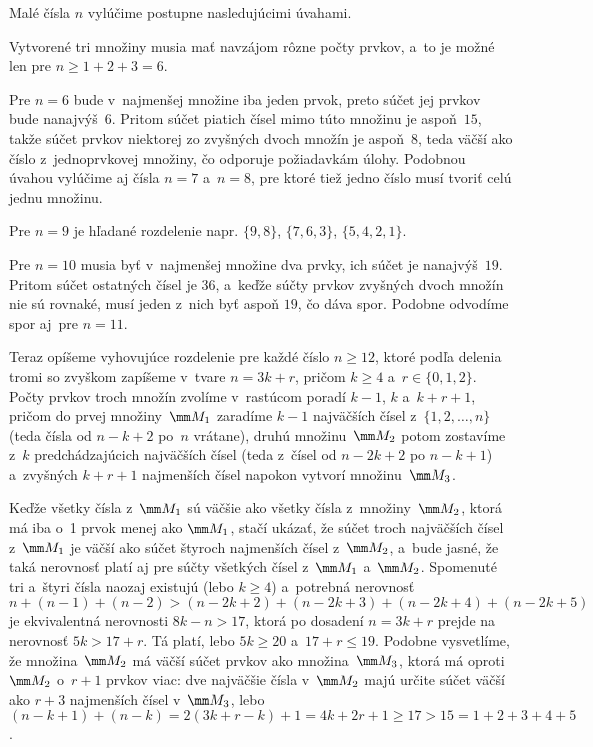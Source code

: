 {%
Malé čísla $n$ vylúčime postupne nasledujúcimi úvahami.

Vytvorené tri množiny musia mať navzájom rôzne počty prvkov, a~to
je možné len pre $n\ge1+2+3= 6$.

Pre $n = 6$ bude v~najmenšej množine iba jeden prvok, preto súčet
jej prvkov bude nanajvýš~$6$. Pritom súčet piatich čísel mimo túto
množinu je aspoň~$15$, takže súčet prvkov niektorej zo
zvyšných dvoch množín je aspoň~$8$, teda väčší ako číslo z~jednoprvkovej
množiny, čo odporuje požiadavkám úlohy. Podobnou
úvahou vylúčime aj čísla $n = 7$ a~$n = 8$, pre ktoré tiež
jedno číslo musí tvoriť celú jednu množinu.

Pre $n=9$ je hľadané rozdelenie napr. $\{9, 8\}$, $\{7, 6, 3\}$, $\{5, 4, 2, 1\}$.

Pre $n = 10$ musia byť v~najmenšej množine dva prvky, ich súčet je
nanajvýš~$19$. Pritom súčet ostatných čísel je $36$, a~keďže
súčty prvkov zvyšných dvoch množín nie sú rovnaké, musí jeden
z~nich byť aspoň $19$, čo dáva spor. Podobne odvodíme spor
aj~pre $n = 11$.

Teraz opíšeme vyhovujúce rozdelenie pre každé číslo $n\ge12$,
ktoré podľa delenia tromi so zvyškom zapíšeme v~tvare $n=3k+r$,
pričom $k\ge4$ a~$r\in\{0, 1, 2\}$. Počty prvkov troch množín zvolíme
v~rastúcom poradí $k-1$, $k$ a~$k+r+1$, pričom do prvej množiny~$\mm M_1$
zaradíme $k-1$ najväčších čísel z~$\{1, 2, \dots,n\}$ (teda čísla
od $n-k+2$ po~$n$ vrátane), druhú množinu~$\mm M_2$ potom zostavíme
z~$k$ predchádzajúcich najväčších čísel (teda z~čísel od $n-2k+2$ po
$n-k+1$) a~zvyšných $k+r+1$ najmenších čísel napokon vytvorí množinu~$\mm M_3$.

Keďže všetky čísla z~$\mm M_1$ sú väčšie ako všetky čísla
z~množiny~$\mm M_2$, ktorá má iba o~1 prvok menej ako $\mm M_1$, stačí
ukázať, že súčet troch najväčších čísel z~$\mm M_1$ je väčší ako
súčet štyroch najmenších čísel z~$\mm M_2$, a~bude jasné, že taká
nerovnosť platí aj pre súčty všetkých čísel z~$\mm M_1$ a~$\mm M_2$.
Spomenuté tri a~štyri čísla naozaj existujú (lebo $k\ge4$)
a~potrebná nerovnosť $n+(n-1)+(n-2)>(n-2k+2)+(n-2k+3)+(n-2k+4)+{(n-2k+5)}$
je ekvivalentná nerovnosti $8k-n>17$, ktorá po dosadení $n=3k+r$ prejde
na nerovnosť $5k>17+r$. Tá platí, lebo $5k\ge20$ a~$17+r\le19$.
Podobne vysvetlíme, že množina~$\mm M_2$ má väčší súčet prvkov ako
množina~$\mm M_3$, ktorá má oproti $\mm M_2$ o~$r+1$ prvkov viac:
dve najväčšie čísla v~$\mm M_2$ majú určite súčet väčší ako $r+3$
najmenších čísel v~$\mm M_3$, lebo
$(n-k+1)+(n-k)=2(3k+r-k)+1=4k+2r+1\ge17>15= 1+2+3+4+5$.

}
